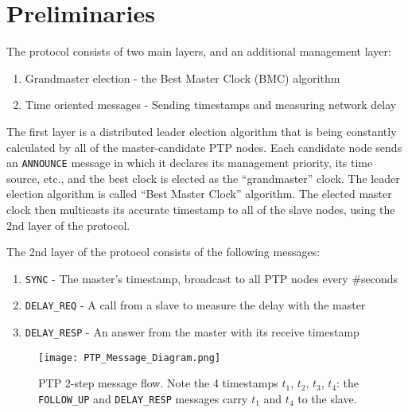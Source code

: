 \documentclass[11pt]{article}
\begin{document}
\section{Preliminaries}

The protocol consists of two main layers, and an additional management layer:

\begin{enumerate}

  \item Grandmaster election - the Best Master Clock (BMC) algorithm

  \item Time oriented messages - Sending timestamps and measuring network delay

\end{enumerate}

The first layer is a distributed leader election algorithm that is being constantly calculated by all of the master-candidate PTP nodes. Each candidate node sends an \texttt{ANNOUNCE} message in which it declares its management priority, its time source, etc., and the best clock is elected as the ``grandmaster'' clock. The leader election algorithm is called ``Best Master Clock'' algorithm. The elected master clock then multicasts its accurate timestamp to all of the slave nodes, using the 2nd layer of the protocol. 



The 2nd layer of the protocol consists of the following messages:

\begin{enumerate}

  \item \texttt{SYNC} - The master's timestamp, broadcast to all PTP nodes every \#seconds

  \item \texttt{DELAY_REQ} - A call from a slave to measure the delay with the master

  \item \texttt{DELAY_RESP} - An answer from the master with its receive timestamp

\end{enumerate}



\begin{figure}[t]

\centerline{\texttt{[image: PTP\_Message\_Diagram.png]}}

\caption{PTP 2-step message flow. Note the 4 timestamps $t_1$, $t_2$, $t_3$, $t_4$: the \texttt{FOLLOW_UP} and \texttt{DELAY_RESP} messages carry $t_1$ and $t_4$ to the slave.}

\label{Messages}

\end{figure}
\end{document}
